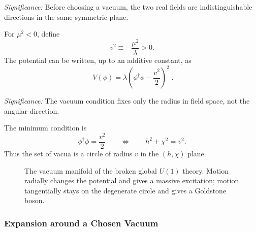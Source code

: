 \textit{Significance:} Before choosing a vacuum, the two real fields are indistinguishable directions in the same symmetric plane.

For $\mu^2<0$, define
\begin{equation}
  v^2\equiv-\frac{\mu^2}{\lambda}>0 .
  \label{eq:lec15:u1_v_definition}
\end{equation}
The potential can be written, up to an additive constant, as
\begin{equation}
  \boxed{\;V(\phi)=\lambda\left(\phi^\dagger\phi-\frac{v^2}{2}\right)^2\; .}
  \label{eq:lec15:u1_mexican_hat_potential}
\end{equation}

\textit{Significance:} The vacuum condition fixes only the radius in field space, not the angular direction.

The minimum condition is
\begin{equation}
  \phi^\dagger\phi=\frac{v^2}{2}
  \qquad\Longleftrightarrow\qquad
  h^2+\chi^2=v^2 .
  \label{eq:lec15:u1_vacuum_manifold}
\end{equation}
Thus the set of vacua is a circle of radius $v$ in the $(h,\chi)$ plane.

\begin{figure}[ht]
\centering
{}
\caption{The vacuum manifold of the broken global $U(1)$ theory. Motion radially changes the potential and gives a massive excitation; motion tangentially stays on the degenerate circle and gives a Goldstone boson.}
\label{fig:lec15:u1-vacuum-circle}
\end{figure}

\subsubsection*{Expansion around a Chosen Vacuum}

